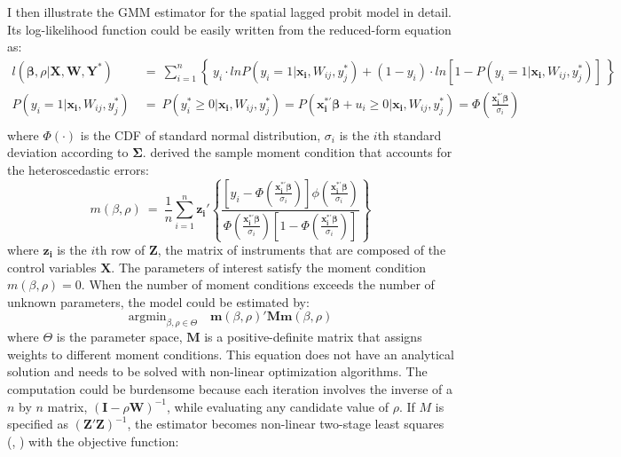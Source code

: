 I then illustrate the GMM estimator for the spatial lagged probit model in detail. Its log-likelihood function could be easily written from the reduced-form equation as:
\begin{equation}
  \nonumber
  \begin{aligned}
    l\left(\bm{\beta},\rho|\bm{X,W,Y^*}\right) \ & = \ \sum_{i=1}^n \left\{ \  y_i \cdot ln P\left(y_i=1|\bm{x_i},W_{ij},y_j^*\right) + \left(1-y_i\right) \cdot ln \left[ 1-P\left(y_i=1|\bm{x_i},W_{ij},y_j^*\right) \right] \ \right\} \\
    P\left(y_i=1|\bm{x_i},W_{ij},y_j^*\right) \ & = \  P\left(y_i^*\geq0|\bm{x_i},W_{ij},y_j^*\right) = P\left(\bm{x_i^{*\prime}\beta}+u_i\geq0|\bm{x_i},W_{ij},y_j^*\right) = \Phi\left( \frac{\bm{x_i^{*\prime}\beta}}{\sigma_i} \right) \\
  \end{aligned}
\end{equation}
where $\Phi(\cdot)$ is the CDF of standard normal distribution, $\sigma_i$ is the $i$th standard deviation according to $\bm{\Sigma}$. \cite{pinkse1998contracting} derived the sample moment condition that accounts for the heteroscedastic errors:
\begin{equation}
  \nonumber
  m\left(\beta,\rho\right) \ = \ \frac{1}{n}\sum_{i=1}^n \bm{z_i'}\left\{ \frac{\left[y_i-\Phi\left(\frac{\bm{x_i^{*\prime}\beta}}{\sigma_i}\right)\right] \phi\left(\frac{\bm{x_i^{*\prime}\beta}}{\sigma_i}\right)}{\Phi\left(\frac{\bm{x_i^{*\prime}\beta}}{\sigma_i}\right) \left[1-\Phi\left(\frac{\bm{x_i^{*\prime}\beta}}{\sigma_i}\right)\right] } \right\}
\end{equation}
where $\bm{z_i}$ is the $i$th row of $\bm{Z}$, the matrix of instruments that are composed of the control variables $\bm{X}$. The parameters of interest satisfy the moment condition $m(\beta,\rho)=0$. When the number of moment conditions exceeds the number of unknown parameters, the model could be estimated by:
\begin{equation}
  \nonumber
  \text{argmin}_{\beta,\rho \in \Theta} \quad  \bm{m}\left(\beta,\rho\right)'
  \bm{M} \bm{m}\left(\beta,\rho\right)
\end{equation}
where $\Theta$ is the parameter space, $\bm{M}$ is a positive-definite matrix that assigns weights to different moment conditions. This equation does not have an analytical solution and needs to be solved with non-linear optimization algorithms. The computation could be burdensome because each iteration involves the inverse of a $n$ by $n$ matrix, $\left(\bm{I}-\rho\bm{W}\right)^{-1}$, while evaluating any candidate value of $\rho$. If $M$ is specified as $\left(\bm{Z}'\bm{Z}\right)^{-1}$, the estimator becomes non-linear two-stage least squares (\cite{amemiya1975nonlinear}, \cite{amemiya1974nonlinear}) with the objective function:
